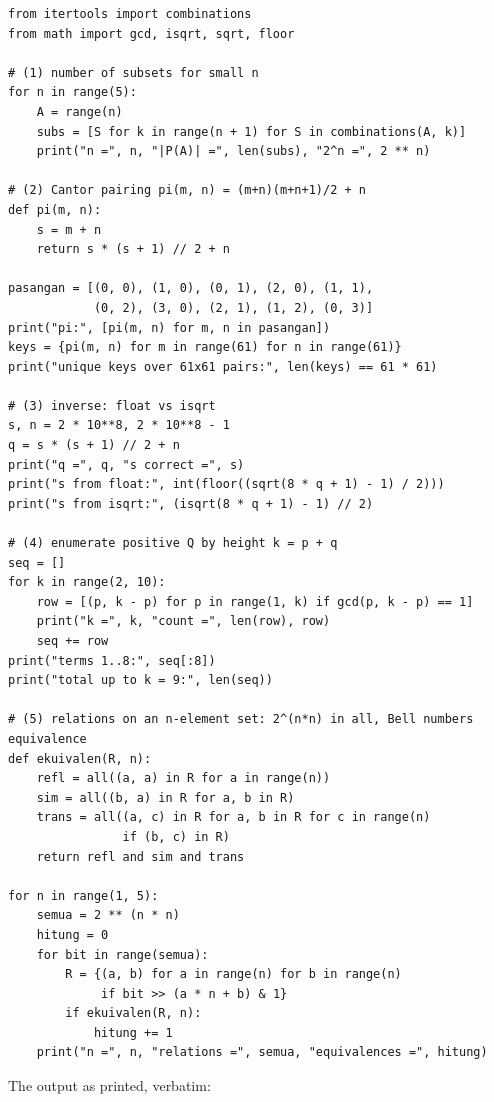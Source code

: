 \begin{lab}
\begin{verbatim}
from itertools import combinations
from math import gcd, isqrt, sqrt, floor

# (1) number of subsets for small n
for n in range(5):
    A = range(n)
    subs = [S for k in range(n + 1) for S in combinations(A, k)]
    print("n =", n, "|P(A)| =", len(subs), "2^n =", 2 ** n)

# (2) Cantor pairing pi(m, n) = (m+n)(m+n+1)/2 + n
def pi(m, n):
    s = m + n
    return s * (s + 1) // 2 + n

pasangan = [(0, 0), (1, 0), (0, 1), (2, 0), (1, 1),
            (0, 2), (3, 0), (2, 1), (1, 2), (0, 3)]
print("pi:", [pi(m, n) for m, n in pasangan])
keys = {pi(m, n) for m in range(61) for n in range(61)}
print("unique keys over 61x61 pairs:", len(keys) == 61 * 61)

# (3) inverse: float vs isqrt
s, n = 2 * 10**8, 2 * 10**8 - 1
q = s * (s + 1) // 2 + n
print("q =", q, "s correct =", s)
print("s from float:", int(floor((sqrt(8 * q + 1) - 1) / 2)))
print("s from isqrt:", (isqrt(8 * q + 1) - 1) // 2)

# (4) enumerate positive Q by height k = p + q
seq = []
for k in range(2, 10):
    row = [(p, k - p) for p in range(1, k) if gcd(p, k - p) == 1]
    print("k =", k, "count =", len(row), row)
    seq += row
print("terms 1..8:", seq[:8])
print("total up to k = 9:", len(seq))

# (5) relations on an n-element set: 2^(n*n) in all, Bell numbers equivalence
def ekuivalen(R, n):
    refl = all((a, a) in R for a in range(n))
    sim = all((b, a) in R for a, b in R)
    trans = all((a, c) in R for a, b in R for c in range(n)
                if (b, c) in R)
    return refl and sim and trans

for n in range(1, 5):
    semua = 2 ** (n * n)
    hitung = 0
    for bit in range(semua):
        R = {(a, b) for a in range(n) for b in range(n)
             if bit >> (a * n + b) & 1}
        if ekuivalen(R, n):
            hitung += 1
    print("n =", n, "relations =", semua, "equivalences =", hitung)
\end{verbatim}
\end{lab}

The output as printed, verbatim:

